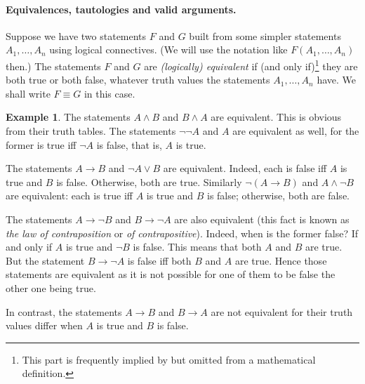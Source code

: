 \documentclass[12pt,notitlepage]{article}
\theoremstyle{plain}
\theoremstyle{definition}
\newtheorem{exm}[thm]{Example}
\theoremstyle{plain}
\newcommand{\1}{\mathbf{1}}
\newcommand{\0}{\mathbf{0}}
\newcommand{\mcomm}[1]{}
\begin{document}
\paragraph{Equivalences, tautologies and valid arguments.} Suppose we have two statements $F$ and $G$ built from some simpler statements $A_1,\ldots,A_n$ using logical connectives. (We will use the notation like $F(A_1,\ldots,A_n)$ then.) The statements $F$ and $G$ are \emph{(logically) equivalent} if (and only if)\footnote{This part is frequently implied by but omitted from a mathematical definition.} they are both true or both false, whatever truth values the statements $A_1,\ldots, A_n$ have. We shall write $F \equiv G$ in this case.
\begin{exm}
The statements $A \wedge B$ and $B \wedge A$ are equivalent. This is obvious from their truth tables. The statements $\neg \neg A$ and $A$ are equivalent as well, for the former is true iff $\neg A$ is false, that is, $A$ is true. 

The statements $A \to B$ and $\neg A \vee B$ are equivalent. Indeed, each is false iff $A$ is true and $B$ is false. Otherwise, both are true. Similarly $\neg(A \to B)$ and $A \wedge \neg B$ are equivalent: each is true iff $A$ is true and $B$ is false; otherwise, both are false.

The statements $A \to \neg B$ and $B \to \neg A$ are also equivalent (this fact is known as \emph{the law of contraposition} or \emph{of contrapositive}). Indeed, when is the former false? If and only if $A$ is true and $\neg B$ is false. This means that both $A$ and $B$ are true. But the statement $B \to \neg A$ is false iff both $B$ and $A$ are true. Hence those statements are equivalent as it is not possible for one of them to be false the other one being true.



In contrast, the statements $A \to B$ and $B \to A$ are not equivalent for their truth values differ when $A$ is true and $B$ is false.
\end{exm}
\mcomm{We believe it is very important to make a clear distinction between a statement and its truth value. We warn students against their bad yet widespread habit of writing $A = 1$ instead of `$A$ is true': let $A$ be $2 + 2 = 4$ and $B$ be the statement of Fermat's Last Theorem; both are known true, so from $A = 1$ and $B = 1$ one could naturally derive $A = B$; are these statements really \emph{the same} while differing so much in complexity? In practice we use the notation $[A] = 1$ to say that the value of $A$ is truth (in a given context), which is, of course, quite lax as it does not specify that context (say, the valuation of atoms when $A$ is compound).}
\end{document}
